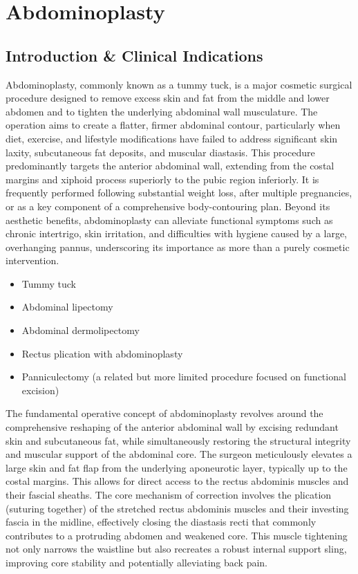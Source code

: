 \chapter{Abdominoplasty}

\section*{Introduction \& Clinical Indications}
Abdominoplasty, commonly known as a tummy tuck, is a major cosmetic surgical procedure designed to remove excess skin and fat from the middle and lower abdomen and to tighten the underlying abdominal wall musculature. The operation aims to create a flatter, firmer abdominal contour, particularly when diet, exercise, and lifestyle modifications have failed to address significant skin laxity, subcutaneous fat deposits, and muscular diastasis. This procedure predominantly targets the anterior abdominal wall, extending from the costal margins and xiphoid process superiorly to the pubic region inferiorly. It is frequently performed following substantial weight loss, after multiple pregnancies, or as a key component of a comprehensive body-contouring plan. Beyond its aesthetic benefits, abdominoplasty can alleviate functional symptoms such as chronic intertrigo, skin irritation, and difficulties with hygiene caused by a large, overhanging pannus, underscoring its importance as more than a purely cosmetic intervention.

\begin{itemize}
  \item Tummy tuck
  \item Abdominal lipectomy
  \item Abdominal dermolipectomy
  \item Rectus plication with abdominoplasty
  \item Panniculectomy (a related but more limited procedure focused on functional excision)
\end{itemize}

The fundamental operative concept of abdominoplasty revolves around the comprehensive reshaping of the anterior abdominal wall by excising redundant skin and subcutaneous fat, while simultaneously restoring the structural integrity and muscular support of the abdominal core. The surgeon meticulously elevates a large skin and fat flap from the underlying aponeurotic layer, typically up to the costal margins. This allows for direct access to the rectus abdominis muscles and their fascial sheaths. The core mechanism of correction involves the plication (suturing together) of the stretched rectus abdominis muscles and their investing fascia in the midline, effectively closing the diastasis recti that commonly contributes to a protruding abdomen and weakened core. This muscle tightening not only narrows the waistline but also recreates a robust internal support sling, improving core stability and potentially alleviating back pain.

